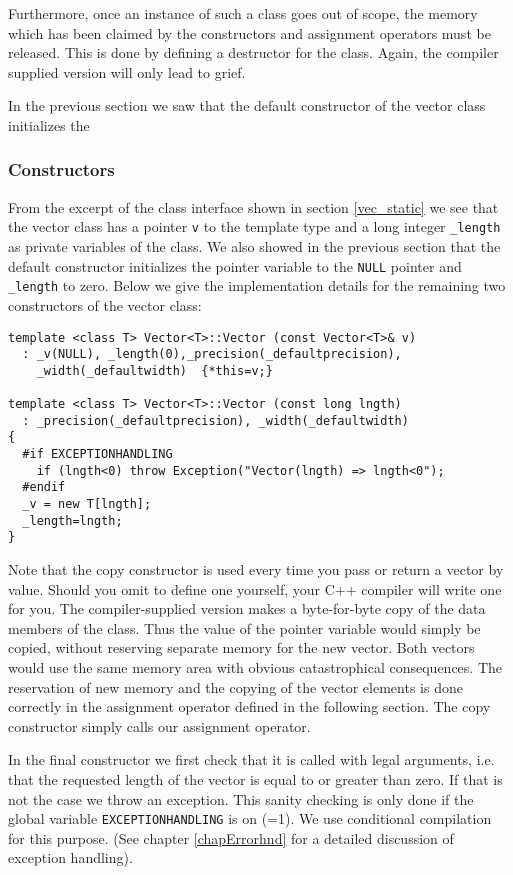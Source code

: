 Furthermore, once an instance of such a class goes out of scope,
the memory which has been claimed by the constructors and
assignment operators must be released. This is done by defining
a destructor for the class. Again, the compiler supplied version will
only lead to grief. 


In the previous section we saw that the default 
constructor of the vector class initializes the


\subsubsection{Constructors}

From the excerpt of the class interface shown in section
\ref{vec_static}
 we see that the vector class has a pointer \verb+v+
to the template type and a long integer \verb+_length+ as
private variables of the class. We also showed in the previous 
section that the default constructor initializes the pointer
variable to the \verb+NULL+ pointer and \verb+_length+ to zero.
Below we give the implementation details for the remaining
two constructors of the vector class:
{\footnotesize \begin{verbatim}
template <class T> Vector<T>::Vector (const Vector<T>& v)
  : _v(NULL), _length(0),_precision(_defaultprecision),
    _width(_defaultwidth)  {*this=v;}

template <class T> Vector<T>::Vector (const long lngth)
  : _precision(_defaultprecision), _width(_defaultwidth)
{
  #if EXCEPTIONHANDLING
    if (lngth<0) throw Exception("Vector(lngth) => lngth<0");
  #endif
  _v = new T[lngth];
  _length=lngth;
}
\end{verbatim}}
Note that the copy 
constructor is used every time you pass or return a vector by
value. Should you omit to define one yourself, your C++ compiler
will write one for you. The compiler-supplied version makes a
byte-for-byte copy of the data members of the class. Thus the
value of the pointer variable would simply be copied, without 
reserving separate memory for the new vector. Both vectors 
would use the same memory area with obvious catastrophical
consequences. The reservation of new memory and the copying
of the vector elements is done correctly in the assignment
operator defined in the following section. The copy constructor
simply calls our assignment operator.

In the final constructor we first check that it is called with legal
arguments, i.e. that the requested length of the vector is equal to
or greater than zero. If that is not the case we throw an exception.
This sanity checking is only done if the global variable 
\verb+EXCEPTIONHANDLING+ is on (=1). We use conditional compilation
for this purpose. (See chapter \ref{chapErrorhnd} for a detailed
discussion of exception handling).

